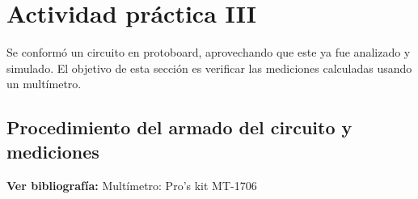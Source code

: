 \noindent
\section{Actividad práctica III} \sangria{} Se conformó un circuito en protoboard, aprovechando que este ya fue analizado y simulado. El objetivo de esta sección es verificar las mediciones calculadas usando un multímetro.
\subsection{Procedimiento del armado del circuito y mediciones}
\begin{center} \textbf{Ver bibliografía:} Multímetro: Pro's kit MT-1706 \end{center}

